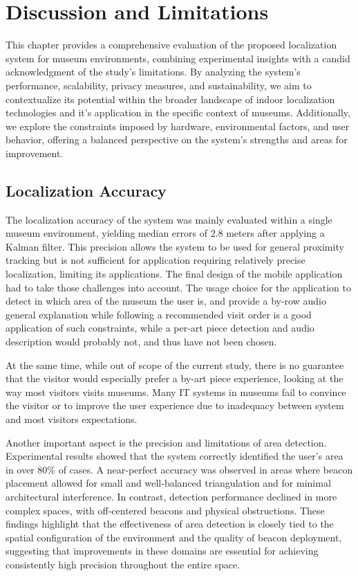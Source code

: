 \chapter{Discussion and Limitations}
\label{chap:discussion}

This chapter provides a comprehensive evaluation of the proposed localization system for museum environments, combining experimental insights with a candid acknowledgment of the study’s limitations. By analyzing the system’s performance, scalability, privacy measures, and sustainability, we aim to contextualize its potential within the broader landscape of indoor localization technologies and it's application in the specific context of museums. Additionally, we explore the constraints imposed by hardware, environmental factors, and user behavior, offering a balanced perspective on the system’s strengths and areas for improvement.

\section{Localization Accuracy}
The localization accuracy of the system was mainly evaluated within a single museum environment, yielding median errors of 2.8 meters after applying a Kalman filter. This precision allows the system to be used for general proximity tracking but is not sufficient for application requiring relatively precise localization, limiting its applications. The final design of the mobile application had to take those challenges into account. The usage choice for the application to detect in which area of the museum the user is, and provide a by-row audio general explanation while following a recommended visit order is a good application of such constraints, while a per-art piece detection and audio description would probably not, and thus have not been chosen.

At the same time, while out of scope of the current study, there is no guarantee that the visitor would especially prefer a by-art piece experience, looking at the way most visitors visits museums. Many IT systems in museums fail to convince the visitor or to improve the user experience due to inadequacy between system and most visitors expectations. %

Another important aspect is the precision and limitations of area detection. Experimental results showed that the system correctly identified the user's area in over 80\% of cases. A near-perfect accuracy was observed in areas where beacon placement allowed for small and well-balanced triangulation and for minimal architectural interference. In contrast, detection performance declined in more complex spaces, with off-centered beacons and physical obstructions. These findings highlight that the effectiveness of area detection is closely tied to the spatial configuration of the environment and the quality of beacon deployment, suggesting that improvements in these domains are essential for achieving consistently high precision throughout the entire space.

